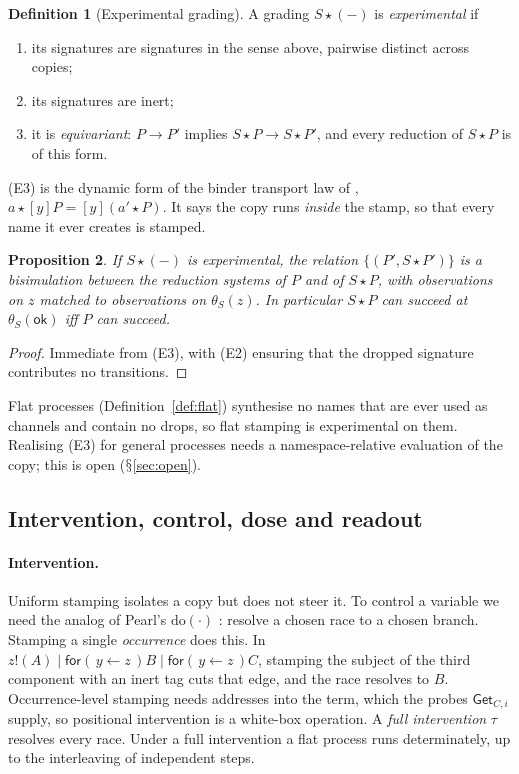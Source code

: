 \documentclass[11pt]{article}
\theoremstyle{definition}
\newtheorem{definition}{Definition}[section]
\theoremstyle{plain}
\newtheorem{proposition}[definition]{Proposition}
\theoremstyle{remark}
\newcommand{\inp}[3]{\mathsf{for}(\,#1 \leftarrow #2\,)#3}
\newcommand{\out}[2]{#1!(#2)}
\DeclareRobustCommand{\S}{\ifmmode\mathsection\else$\mathsection$\fi}
\newcommand{\ok}{\mathsf{ok}}
\newcommand{\act}{\mathbin{\star}}
\begin{document}
\begin{definition}[Experimental grading]\label{def:expgrading}
A grading $S \act (-)$ is \emph{experimental} if
\begin{enumerate}[label=(E\arabic*),leftmargin=2.6em,nosep]
\item its signatures are signatures in the sense above, pairwise
distinct across copies;
\item its signatures are inert;
\item it is \emph{equivariant}: $P \to P'$ implies $S \act P \to S \act
P'$, and every reduction of $S \act P$ is of this form.
\end{enumerate}
\end{definition}

(E3) is the dynamic form of the binder transport law of \cite{FuzzyRho},
$a \act [y]P = [y](a' \act P)$. It says the copy runs \emph{inside} the
stamp, so that every name it ever creates is stamped.

\begin{proposition}\label{prop:fidelity}
If $S \act (-)$ is experimental, the relation $\{(P', S \act P')\}$ is a
bisimulation between the reduction systems of $P$ and of $S \act P$, with
observations on $z$ matched to observations on $\theta_S(z)$. In
particular $S \act P$ can succeed at $\theta_S(\ok)$ iff $P$ can succeed.
\end{proposition}

\begin{proof}
Immediate from (E3), with (E2) ensuring that the dropped signature
contributes no transitions.
\end{proof}

Flat processes (Definition~\ref{def:flat}) synthesise no names that are
ever used as channels and contain no drops, so flat stamping is
experimental on them. Realising (E3) for general processes needs a
namespace-relative evaluation of the copy; this is open
(\S\ref{sec:open}).

\subsection{Intervention, control, dose and readout}

\paragraph{Intervention.} Uniform stamping isolates a copy but does not
steer it. To control a variable we need the analog of Pearl's
$\mathrm{do}(\cdot)$ \cite{Pearl09}: resolve a chosen race to a chosen
branch. Stamping a single \emph{occurrence} does this. In
$\out{z}{A} \mid \inp{y}{z}{B} \mid \inp{y}{z}{C}$, stamping the subject
of the third component with an inert tag cuts that edge, and the race
resolves to $B$. Occurrence-level stamping needs addresses into the term,
which the probes $\mathsf{Get}_{C,i}$ supply, so positional intervention
is a white-box operation. A \emph{full intervention} $\tau$ resolves
every race. Under a full intervention a flat process runs determinately,
up to the interleaving of independent steps.
\end{document}
